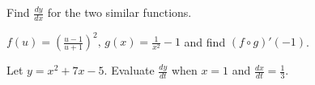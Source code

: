 \documentclass[addpoints, 12pt]{exam}
\begin{document}
\begin{questions}
    
    \newpage
    
    \question Find $\displaystyle\frac{dy}{dx}$ for the two similar functions.
    
    
    \question $\displaystyle f(u)=\left(\frac{u-1}{u+1}\right)^2,\, g(x)=\frac{1}{x^2}-1$ and find $(f\circ g)'(-1)$.
    
    
    \question Let $y=x^2+7x-5.$ Evaluate $\displaystyle\frac{dy}{dt}$ when $x=1$ and $\displaystyle\frac{dx}{dt}=\frac{1}{3}$.
    
    

    
\end{questions}
\end{document}
